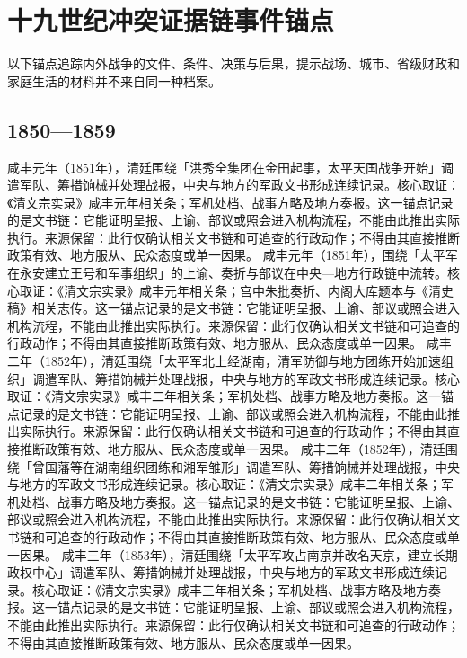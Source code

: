 \section{十九世纪冲突证据链事件锚点}
以下锚点追踪内外战争的文件、条件、决策与后果，提示战场、城市、省级财政和家庭生活的材料并不来自同一种档案。
\subsection{1850—1859}
咸丰元年（1851年），清廷围绕「洪秀全集团在金田起事，太平天国战争开始」调遣军队、筹措饷械并处理战报，中央与地方的军政文书形成连续记录。核心取证：《清文宗实录》咸丰元年相关条；军机处档、战事方略及地方奏报。这一锚点记录的是文书链：它能证明呈报、上谕、部议或照会进入机构流程，不能由此推出实际执行。来源保留：此行仅确认相关文书链和可追查的行政动作；不得由其直接推断政策有效、地方服从、民众态度或单一因果。
咸丰元年（1851年），围绕「太平军在永安建立王号和军事组织」的上谕、奏折与部议在中央—地方行政链中流转。核心取证：《清文宗实录》咸丰元年相关条；宫中朱批奏折、内阁大库题本与《清史稿》相关志传。这一锚点记录的是文书链：它能证明呈报、上谕、部议或照会进入机构流程，不能由此推出实际执行。来源保留：此行仅确认相关文书链和可追查的行政动作；不得由其直接推断政策有效、地方服从、民众态度或单一因果。
咸丰二年（1852年），清廷围绕「太平军北上经湖南，清军防御与地方团练开始加速组织」调遣军队、筹措饷械并处理战报，中央与地方的军政文书形成连续记录。核心取证：《清文宗实录》咸丰二年相关条；军机处档、战事方略及地方奏报。这一锚点记录的是文书链：它能证明呈报、上谕、部议或照会进入机构流程，不能由此推出实际执行。来源保留：此行仅确认相关文书链和可追查的行政动作；不得由其直接推断政策有效、地方服从、民众态度或单一因果。
咸丰二年（1852年），清廷围绕「曾国藩等在湖南组织团练和湘军雏形」调遣军队、筹措饷械并处理战报，中央与地方的军政文书形成连续记录。核心取证：《清文宗实录》咸丰二年相关条；军机处档、战事方略及地方奏报。这一锚点记录的是文书链：它能证明呈报、上谕、部议或照会进入机构流程，不能由此推出实际执行。来源保留：此行仅确认相关文书链和可追查的行政动作；不得由其直接推断政策有效、地方服从、民众态度或单一因果。
咸丰三年（1853年），清廷围绕「太平军攻占南京并改名天京，建立长期政权中心」调遣军队、筹措饷械并处理战报，中央与地方的军政文书形成连续记录。核心取证：《清文宗实录》咸丰三年相关条；军机处档、战事方略及地方奏报。这一锚点记录的是文书链：它能证明呈报、上谕、部议或照会进入机构流程，不能由此推出实际执行。来源保留：此行仅确认相关文书链和可追查的行政动作；不得由其直接推断政策有效、地方服从、民众态度或单一因果。
